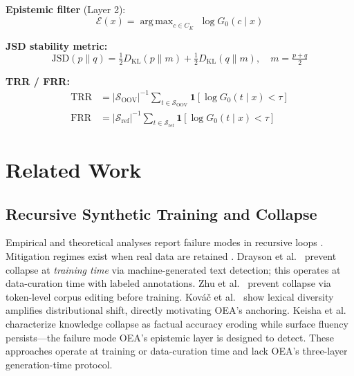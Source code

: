 \documentclass[11pt]{article}
\DeclareMathOperator*{\argmax}{arg\,max}
\begin{document}
\noindent\textbf{Epistemic filter} (Layer 2):
\begin{equation}
\mathcal{E}(x) = \argmax_{c \in C_K}\; \log G_0(c \mid x)
\end{equation}

\noindent\textbf{JSD stability metric:}
\begin{equation}
\mathrm{JSD}(p \| q) = \tfrac{1}{2} D_{\mathrm{KL}}(p \| m) + \tfrac{1}{2} D_{\mathrm{KL}}(q \| m), \quad m = \tfrac{p + q}{2}
\end{equation}

\noindent\textbf{TRR / FRR:}
\begin{align}
\mathrm{TRR} &= |\mathcal{S}_{\mathrm{OOV}}|^{-1}\sum_{t \in \mathcal{S}_{\mathrm{OOV}}} \mathbf{1}[\log G_0(t \mid x) < \tau] \\
\mathrm{FRR} &= |\mathcal{S}_{\mathrm{ref}}|^{-1}\sum_{t \in \mathcal{S}_{\mathrm{ref}}} \mathbf{1}[\log G_0(t \mid x) < \tau]
\end{align}

\section{Related Work}
\label{sec:related}

\subsection{Recursive Synthetic Training and Collapse}

Empirical and theoretical analyses report failure modes in recursive loops \cite{shumailov2024modelcollapse,fu2025theoretical}. Mitigation regimes exist when real data are retained \cite{gerstgrasser2024inevitable}.
Drayson et al.~\cite{drayson2025detection} prevent collapse at \emph{training time} via machine-generated text detection; this operates at data-curation time with labeled annotations. Zhu et al.~\cite{zhu2025synthesize} prevent collapse via token-level corpus editing before training. Kov\'{a}\v{c} et al.~\cite{kovac2025recursive} show lexical diversity amplifies distributional shift, directly motivating OEA's anchoring. Keisha et al.~\cite{keisha2025knowledge} characterize knowledge collapse as factual accuracy eroding while surface fluency persists---the failure mode OEA's epistemic layer is designed to detect.
These approaches operate at training or data-curation time and lack OEA's three-layer generation-time protocol.
\end{document}
